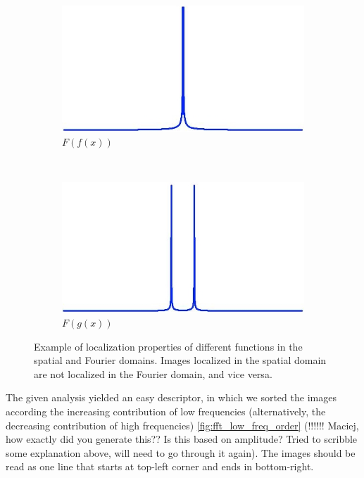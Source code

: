 \documentclass{report}
\begin{document}
\begin{figure}[h]
        \begin{subfigure}[b]{0.2\textwidth}
                \includegraphics[width=\textwidth]{graphics/graph_fft_3.jpg}
                \caption{$F(f(x))$}
                \label{fig:mouse}
        \end{subfigure}
        ~
        \begin{subfigure}[b]{0.2\textwidth}
                \includegraphics[width=\textwidth]{graphics/graph_fft_4.jpg}
                \caption{$F(g(x))$}
                \label{fig:mouse}
        \end{subfigure}
        \caption{Example of localization properties of different functions in the spatial and Fourier domains. Images localized in the spatial domain are not localized in the Fourier domain, and vice versa.}\label{fig:fft_localization}
\end{figure}

The given analysis yielded an easy descriptor, in which we sorted the images according the increasing contribution of low frequencies (alternatively, the decreasing contribution of high frequencies) \ref{fig:fft_low_freq_order} (!!!!!! Maciej, how exactly did you generate this?? Is this based on amplitude? {\color{red}Tried to scribble some explanation above, will need to go through it again}). The images should be read as one line that starts at top-left corner and ends in bottom-right. 
\end{document}
